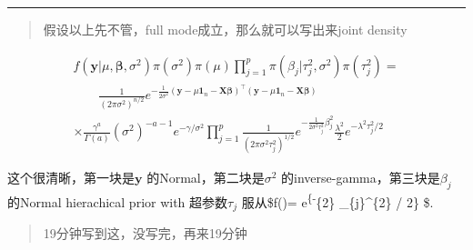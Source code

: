 \documentclass[
]{book}
\theoremstyle{definition}
\theoremstyle{definition}
\theoremstyle{definition}
\theoremstyle{remark}
\begin{document}
\begin{center}\rule{0.5\linewidth}{0.5pt}\end{center}

\begin{quote}
假设以上先不管，full mode成立，那么就可以写出来joint density
\end{quote}

\[
\begin{array}{l}{f\left(\boldsymbol{y} | \mu, \boldsymbol{\beta}, \sigma^{2}\right) \pi\left(\sigma^{2}\right) \pi(\mu) \prod_{j=1}^{p} \pi\left(\beta_{j} | \tau_{j}^{2}, \sigma^{2}\right) \pi\left(\tau_{j}^{2}\right)=} \\ {\qquad \frac{1}{\left(2 \pi \sigma^{2}\right)^{n / 2}} e^{-\frac{1}{2 \sigma^{2}}\left(\boldsymbol{y}-\mu \mathbf{1}_{n}-\boldsymbol{X} \boldsymbol{\beta}\right)^{\top}\left(\boldsymbol{y}-\mu \mathbf{1}_{n}-\boldsymbol{X} \boldsymbol{\beta}\right)}} \\ { \times \frac{\gamma^{a}}{\Gamma(a)}\left(\sigma^{2}\right)^{-a-1} e^{-\gamma / \sigma^{2}} \prod_{j=1}^{p} \frac{1}{\left(2 \pi \sigma^{2} \tau_{j}^{2}\right)^{1 / 2}} e^{-\frac{1}{2 \sigma^{2} \tau_{j}^{2}} \beta_{j}^{2}} \frac{\lambda^{2}}{2} e^{-\lambda^{2} \tau_{j}^{2} / 2}}\end{array}
\]

这个很清晰，第一块是\(\boldsymbol y\) 的Normal，第二块是\(\sigma^2\) 的inverse-gamma，第三块是\(\beta_j\) 的Normal hierachical prior with 超参数\(\tau_j\) 服从\$f(\tau)= e\textsuperscript{\{-\lambda}\{2\} \tau\_\{j\}\^{}\{2\} / 2\} \$.

\begin{quote}
19分钟写到这，没写完，再来19分钟
\end{quote}
\end{document}
